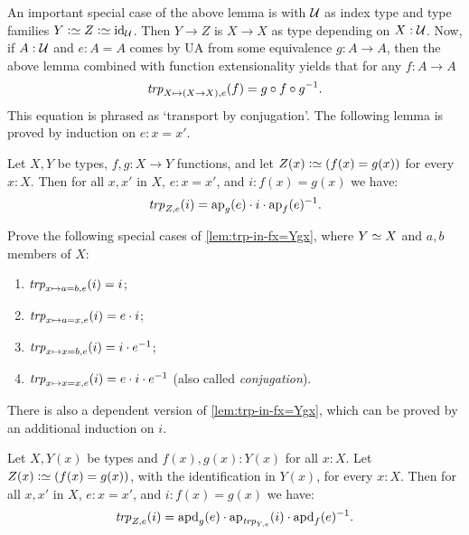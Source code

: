 An important special case of the above lemma is with ${\mathcal{U}}$
as index type and type families $Y\defeq Z\defeq \id_\UU$.
Then $Y\to Z$ is $X\to X$ as type depending on $X:{\mathcal{U}}$. Now, 
if $A:{\mathcal{U}}$ and $e: A=A$ comes by UA from some equivalence 
$g:A\to A$, then the above lemma combined with function extensionality 
yields that for any $f: A\to A$
\[
\trp[X \mapsto (X\to X)]{e} (f) = g\circ f \circ g^{-1}.
\]
This equation is phrased as `transport by conjugation'.
The following lemma is proved by induction on $e: x=x'$.

\begin{lemma}\label{lem:trp-in-fx=Ygx}
Let $X,Y$ be types, $f,g: X\to Y$ functions, and let
$Z(x)\defeq (f(x)=g(x))$ for every $x:X$. 
Then for all $x,x'$ in $X$, $e: x=x'$, and $i: f(x)=g(x)$ we have:
\[
\trp[Z]{ e} (i) = \ap{g}(e) \cdot i \cdot \ap{f}(e)^{-1}.
\]
\end{lemma}

\begin{xca}\label{xca:trp-in-a/x=b/x}
Prove the following special cases of \cref{lem:trp-in-fx=Ygx},
where $Y\jdeq X$ and $a,b$ members of $X$:
\begin{enumerate}
\item $\trp[x\mapsto a=b]{e} (i) = i$;
\item\label{trp-in-a=x} $\trp[x\mapsto a=x]{e} (i) = e\cdot i$;
\item $\trp[x\mapsto x=b]{e} (i) = i \cdot e^{-1}$;
\item \label{trp-in-x=x}$\trp[x\mapsto x=x]{e} (i) = e \cdot i\cdot e^{-1}$ 
(also called \emph{conjugation}).
\end{enumerate}
\end{xca}

There is also a dependent version of \cref{lem:trp-in-fx=Ygx},
which can be proved by an additional induction on $i$.

\begin{lemma}\label{lem:trp-in-fx=Yxgx}
Let $X,Y(x)$ be types and $f(x),g(x): Y(x)$ for all $x:X$. 
Let $Z(x)\defeq (f(x)=g(x))$,
with the identification in $Y(x)$, for every $x:X$. 
Then for all $x,x'$ in $X$, $e: x=x'$, and $i: f(x)=g(x)$ we have:
\[
\trp[Z]{ e} (i) = \apd{g}(e) \cdot \ap{\trp[Y]{e}}(i) \cdot \apd{f}(e)^{-1}.
\]
\end{lemma}

